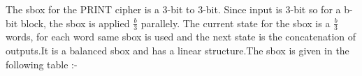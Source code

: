 \documentclass[journal=tosc,preprint]{iacrtrans}
\begin{document}
The sbox for the PRINT cipher is a 3-bit to 3-bit. Since input is 3-bit so for a b-bit block, the sbox is applied $\frac{b}{3}$ parallely. The current state for the sbox is a $\frac{b}{3}$ words, for each word same sbox is used and the next state is the concatenation of outputs.It is a balanced sbox and has a linear structure.The sbox is given in the following table :- \newline

\begin{table}[ht]
	\centering
\end{table}
\end{document}
